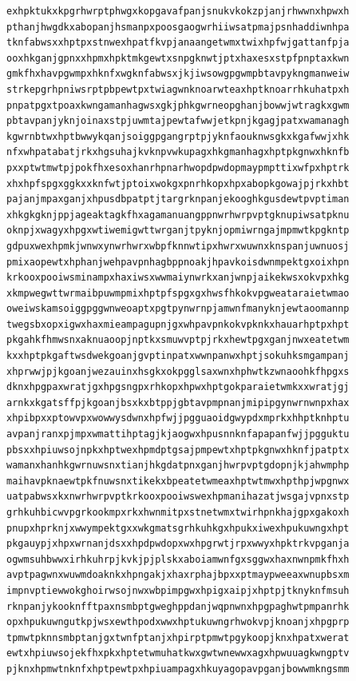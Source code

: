 \documentclass[11pt,letterpaper]{exam}
\begin{document}
\begin{questions}
\begin{verbatim}
exhpktukxkpgrhwrptphwgxkopgavafpanjsnukvkokzpjanjrhwwnxhpwxh
pthanjhwgdkxabopanjhsmanpxpoosgaogwrhiiwsatpmajpsnhaddiwnhpa
tknfabwsxxhptpxstnwexhpatfkvpjanaangetwmxtwixhpfwjgattanfpja
ooxhkganjgpnxxhpmxhpktmkgewtxsnpgknwtjptxhaxesxstpfpnptaxkwn
gmkfhxhavpgwmpxhknfxwgknfabwsxjkjiwsowgpgwmpbtavpykngmanweiw
strkepgrhpniwsrptpbpewtpxtwiagwnknoarwteaxhptknoarrhkuhatpxh
pnpatpgxtpoaxkwngamanhagwsxgkjphkgwrneopghanjbowwjwtragkxgwm
pbtavpanjyknjoinaxstpjuwmtajpewtafwwjetkpnjkgagjpatxwamanagh
kgwrnbtwxhptbwwykqanjsoiggpgangrptpjyknfaouknwsgkxkgafwwjxhk
nfxwhpatabatjrkxhgsuhajkvknpvwkupagxhkgmanhagxhptpkgnwxhknfb
pxxptwtmwtpjpokfhxesoxhanrhpnarhwopdpwdopmaypmpttixwfpxhptrk
xhxhpfspgxggkxxknfwtjptoixwokgxpnrhkopxhpxabopkgowajpjrkxhbt
pajanjmpaxganjxhpusdbpatptjtargrknpanjekooghkgusdewtpvptiman
xhkgkgknjppjageaktagkfhxagamanuangppnwrhwrpvptgknupiwsatpknu
oknpjxwagyxhpgxwtiwemigwttwrganjtpyknjopmiwrngajmpmwtkpgkntp
gdpuxwexhpmkjwnwxynwrhwrxwbpfknnwtipxhwrxwuwnxknspanjuwnuosj
pmixaopewtxhphanjwehpavpnhagbppnoakjhpavkoisdwnmpektgxoixhpn
krkooxpooiwsminampxhaxiwsxwwmaiynwrkxanjwnpjaikekwsxokvpxhkg
xkmpwegwttwrmaibpuwmpmixhptpfspgxgxhwsfhkokvpgweataraietwmao
oweiwskamsoiggpggwnweoaptxpgtpynwrnpjamwnfmanyknjewtaoomannp
twegsbxopxigwxhaxmieampagupnjgxwhpavpnkokvpknkxhauarhptpxhpt
pkgahkfhmwsnxaknuaoopjnptkxsmuwvptpjrkxhewtpgxganjnwxeatetwm
kxxhptpkgaftwsdwekgoanjgvptinpatxwwnpanwxhptjsokuhksmgampanj
xhprwwjpjkgoanjwezauinxhsgkxokpgglsaxwnxhphwtkzwnaoohkfhpgxs
dknxhpgpaxwratjgxhpgsngpxrhkopxhpwxhptgokparaietwmkxxwratjgj
arnkxkgatsffpjkgoanjbsxkxbtppjgbtavpmpnanjmipipgynwrnwnpxhax
xhpibpxxptowvpxwowwysdwnxhpfwjjpgguaoidgwypdxmprkxhhptknhptu
avpanjranxpjmpxwmattihptagjkjaogwxhpusnnknfapapanfwjjpgguktu
pbsxxhpiuwsojnpkxhptwexhpmdptgsajpmpewtxhptpkgnwxhknfjpatptx
wamanxhanhkgwrnuwsnxtianjhkgdatpnxganjhwrpvptgdopnjkjahwmphp
maihavpknaewtpkfnuwsnxtikekxbpeatetwmeaxhptwtmwxhpthpjwpgnwx
uatpabwsxkxnwrhwrpvptkrkooxpooiwswexhpmanihazatjwsgajvpnxstp
grhkuhbicwvpgrkookmpxrkxhwnmitpxstnetwmxtwirhpnkhajgpxgakoxh
pnupxhprknjxwwympektgxxwkgmatsgrhkuhkgxhpukxiwexhpukuwngxhpt
pkgauypjxhpxwrnanjdsxxhpdpwdopxwxhpgrwtjrpxwwyxhpktrkvpganja
ogwmsuhbwwxirhkuhrpjkvkjpjplskxaboiamwnfgxsggwxhaxnwnpmkfhxh
avptpagwnxwuwmdoaknkxhpngakjxhaxrphajbpxxptmaypweeaxwnupbsxm
impnvptiewwokghoirwsojnwxwbpimpgwxhpigxaipjxhptpjtknyknfmsuh
rknpanjykooknfftpaxnsmbptgweghppdanjwqpnwnxhpgpaghwtpmpanrhk
opxhpukuwngutkpjwsxewthpodxwwxhptukuwngrhwokvpjknoanjxhpgprp
tpmwtpknnsmbptanjgxtwnfptanjxhpirptpmwtpgykoopjknxhpatxwerat
ewtxhpiuwsojekfhxpkxhptetwmuhatkwxgwtwnewwxagxhpwuuagkwngptv
pjknxhpmwtnknfxhptpewtpxhpiuampagxhkuyagopavpganjbowwmkngsmm

\end{verbatim}
\end{questions}
\end{document}
